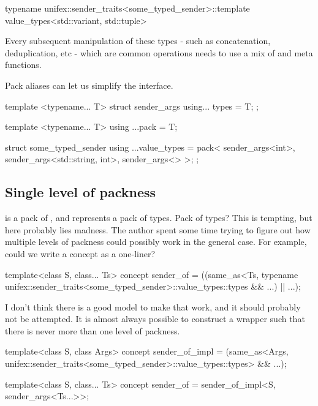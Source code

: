 \documentclass{wg21}
\begin{document}
\begin{colorblock}
    typename unifex::sender_traits<some_typed_sender>::template value_types<std::variant, std::tuple>
\end{colorblock}

Every subsequent manipulation of these types - such as concatenation, deduplication, etc - which are common operations needs to
use a mix of  and  meta functions.

Pack aliases can let us simplify the interface.

\begin{colorblock}
    template <typename... T>
    struct sender_args {
        using... types = T;
    };

    template <typename... T>
    using ...pack = T;

    struct some_typed_sender {
        using ...value_types = pack<
            sender_args<int>,
            sender_args<std::string, int>,
            sender_args<>
        >;
    };
\end{colorblock}

\subsection{Single level of packness}

 is a pack of , and  represents a
pack of types. Pack of types?
This is tempting, but here probably lies madness.
The author spent some time trying to figure out how multiple levels of packness could possibly work in the general case. For example, could we
write a  concept as a one-liner?

\begin{colorblock}
    template<class S, class... Ts>
    concept sender_of = ((same_as<Ts,
    typename unifex::sender_traits<some_typed_sender>::value_types::types && ...) || ...);
\end{colorblock}

I don't think there is a good model to make that work, and it should probably not be attempted.
It is almost always possible to construct a wrapper such that there is never more than one level of packness.

\begin{colorblock}
    template<class S, class Args>
    concept sender_of_impl =
    (same_as<Args, unifex::sender_traits<some_typed_sender>::value_types::types> && ...);

    template<class S, class... Ts>
    concept sender_of = sender_of_impl<S, sender_args<Ts...>>;
\end{colorblock}
\end{document}
